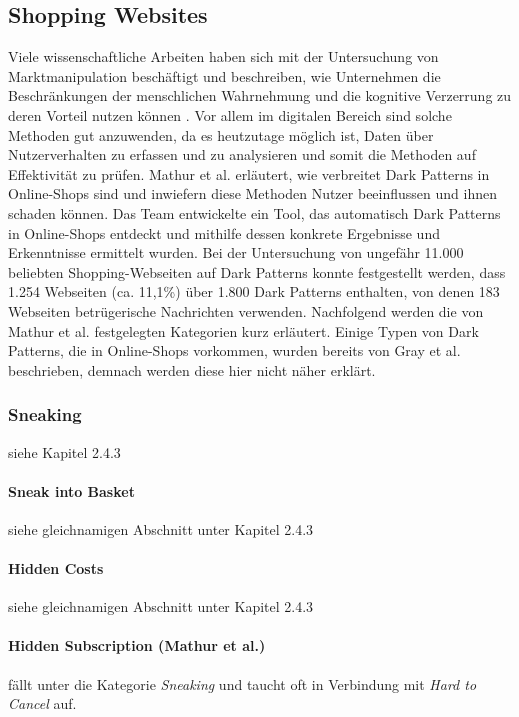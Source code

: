 \documentclass[a4paper]{article}
\begin{document}
\subsection{Shopping Websites}
\label{sub:shopping}
Viele wissenschaftliche Arbeiten haben sich mit der Untersuchung von Marktmanipulation beschäftigt und beschreiben, wie Unternehmen die Beschränkungen der menschlichen Wahrnehmung und die kognitive Verzerrung zu deren Vorteil nutzen können \cite{mathur}\cite{narayanan}. Vor allem im digitalen Bereich sind solche Methoden gut anzuwenden, da es heutzutage möglich ist, Daten über Nutzerverhalten zu erfassen und zu analysieren und somit die Methoden auf Effektivität zu prüfen.\newline\newline
Mathur et al. erläutert, wie verbreitet Dark Patterns in Online-Shops sind und inwiefern diese Methoden Nutzer beeinflussen und ihnen schaden können. Das Team entwickelte ein Tool, das automatisch Dark Patterns in Online-Shops entdeckt und mithilfe dessen konkrete Ergebnisse und Erkenntnisse ermittelt wurden. Bei der Untersuchung von ungefähr 11.000 beliebten Shopping-Webseiten auf Dark Patterns konnte festgestellt werden, dass 1.254 Webseiten (ca. 11,1\%) über 1.800 Dark Patterns enthalten, von denen 183 Webseiten betrügerische Nachrichten verwenden.\newline\newline     
Nachfolgend werden die von Mathur et al. festgelegten Kategorien kurz erläutert. Einige Typen von Dark Patterns, die in Online-Shops vorkommen, wurden bereits von Gray et al. beschrieben, demnach werden diese hier nicht näher erklärt. 

\subsubsection{Sneaking}
siehe Kapitel 2.4.3

\paragraph{Sneak into Basket}
siehe gleichnamigen Abschnitt unter Kapitel 2.4.3

\paragraph{Hidden Costs}
siehe gleichnamigen Abschnitt unter Kapitel 2.4.3

\paragraph{Hidden Subscription (Mathur et al.)} fällt unter die Kategorie \textit{Sneaking} und taucht oft in Verbindung mit \textit{Hard to Cancel} auf. 
\end{document}
